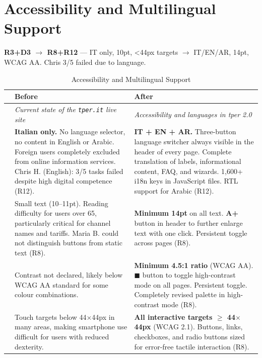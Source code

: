 \vspace{0.3cm}

\section{Accessibility and Multilingual Support}
\label{sec:comparison-a11y}

\textbf{R3+D3 $\rightarrow$ R8+R12} --- IT only, 10pt, <44px targets $\rightarrow$ IT/EN/AR, 14pt, WCAG AA. Chris 3/5 failed due to language.

\begin{table}[H]
\centering
\small
\renewcommand{\arraystretch}{1.4}
\begin{tabular}{|p{0.5cm}|p{7cm}|p{7cm}|}
\hline
& \textbf{Before} & \textbf{After} \\ \hline
\cellcolor{primaryColor!15} &
\textit{Current state of the \texttt{tper.it} live site} &
\textit{Accessibility and languages in tper 2.0} \\ \hline

\raisebox{0.5cm}{\rotatebox{90}{\textbf{Language}}} &
\textbf{Italian only.} No language selector, no content in English or Arabic. Foreign users completely excluded from online information services. Chris H. (English): 3/5 tasks failed despite high digital competence (R12). &
\textbf{IT + EN + AR.} Three-button language switcher always visible in the header of every page. Complete translation of labels, informational content, FAQ, and wizards. 1,600+ i18n keys in JavaScript files. RTL support for Arabic (R12). \\ \hline

\raisebox{0.5cm}{\rotatebox{90}{\textbf{Font Size}}} &
Small text (10--11pt). Reading difficulty for users over 65, particularly critical for channel names and tariffs. Maria B. could not distinguish buttons from static text (R8). &
\textbf{Minimum 14pt} on all text. \textbf{A+} button in header to further enlarge text with one click. Persistent toggle across pages (R8). \\ \hline

\raisebox{0.5cm}{\rotatebox{90}{\textbf{Contrast}}} &
Contrast not declared, likely below WCAG AA standard for some colour combinations. &
\textbf{Minimum 4.5:1 ratio} (WCAG AA). \textbf{$\blacksquare$} button to toggle high-contrast mode on all pages. Persistent toggle. Completely revised palette in high-contrast mode (R8). \\ \hline


\raisebox{0.5cm}{\rotatebox{90}{\textbf{Touch Targets}}} &
Touch targets below 44$\times$44px in many areas, making smartphone use difficult for users with reduced dexterity. &
\textbf{All interactive targets $\ge$ 44$\times$44px} (WCAG 2.1). Buttons, links, checkboxes, and radio buttons sized for error-free tactile interaction (R8). \\ \hline
\end{tabular}
\caption{Accessibility and Multilingual Support}
\label{tab:comparison-a11y}
\end{table}

